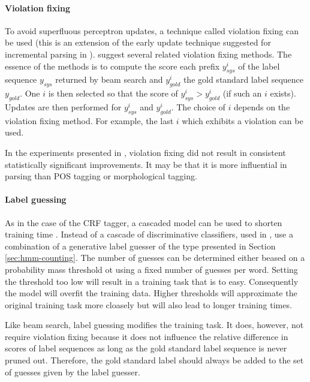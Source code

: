 \paragraph{Violation fixing} To avoid superfluous perceptron updates,
a technique called violation fixing can be used \citep{Huang2012}
(this is an extension of the early update technique suggested for
incremental parsing in \cite{Collins2004}). \cite{Huang2012} suggest
several related violation fixing methods. The essence of the methods
is to compute the score each prefix $y_{sys}^i$ of the label sequence
$y_{sys}$ returned by beam search and $y_{gold}^i$ the gold standard
label sequence $y_{gold}$. One $i$ is then selected so that the score
of $y_{sys}^i > y_{gold}^i$ (if such an $i$ exists). Updates are then
performed for $y_{sys}^i$ and $y_{gold}^i$. The choice of $i$ depends
on the violation fixing method. For example, the last $i$ which
exhibits a violation can be used.

In the experiments presented in \cite{Silfverberg2015}, violation
fixing did not result in consistent statistically significant
improvements. It may be that it is more influential in parsing than
POS tagging or morphological tagging.

\paragraph{Label guessing} As in the case of the CRF tagger, a
cascaded model can be used to shorten training time
\citep{Silfverberg2015}. Instead of a cascade of discriminative
classifiers, used in \citep{Muller2013}, \cite{Silfverberg2015} use a
combination of a generative label guesser of the type presented in
Section \ref{sec:hmm-counting}. The number of guesses can be
determined either beased on a probability mass threshold ot using a
fixed number of guesses per word. Setting the threshold too low will
result in a training task that is to easy. Consequently the model will
overfit the training data. Higher thresholds will approximate the
original training task more cloasely but will also lead to longer
training times.

Like beam search, label guessing modifies the training task. It does,
however, not require violation fixing because it does not influence
the relative difference in scores of label sequences as long as the
gold standard label sequence is never pruned out. Therefore, the gold
standard label should always be added to the set of guesses given by
the label guesser.

